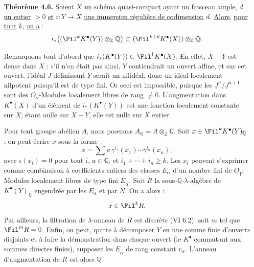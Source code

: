 
\textbf{Théorème 4.6.}
\uline{Soient} \(X\) \uline{un schéma quasi-compact ayant un faisceau ample}, \(d\) \uline{un entier} \(>0\) \uline{et} \(i:Y\to X\) \uline{une immersion régulière de codimension} \(d\). \uline{Alors}, \uline{pour tout} \(k\), \uline{on a} :
\[
 i_*\bigl((\Fil^kK^{\bullet}(Y))\otimes_{\mathbb Z}\mathbb Q\bigr)
 \subset
 (\Fil^{k+d}K^{\bullet}(X))\otimes_{\mathbb Z}\mathbb Q.
\]

Remarquons tout d'abord que \(i_*(K^{\bullet}(Y))\subset \Fil^1K^{\bullet}(X)\). En effet, \(X-Y\) est dense dans \(X\) : s'il n'en était pas ainsi, \(Y\) contiendrait un ouvert affine, et sur cet ouvert, l'idéal \(\underline{J}\) définissant \(Y\) serait un nilidéal, donc un idéal localement nilpotent puisqu'il est de type fini. Or ceci est impossible, puisque les \(\underline{J}^n/\underline{J}^{n+1}\) sont des \(\underline{O}_Y\)-Modules localement libres de rang \(\ne0\). L'augmentation dans \(K^{\bullet}(X)\) d'un élément de \(i_*(K^{\bullet}(Y))\) est une fonction localement constante sur \(X\); étant nulle sur \(X-Y\), elle est nulle sur \(X\) entier.

Pour tout groupe abélien \(A\), nous poserons \(A_{\mathbb Q}=A\otimes_{\mathbb Z}\mathbb Q\). Soit \(x\in\Fil^kK^{\bullet}(Y)_{\mathbb Q}\) ; on peut écrire \(x\) sous la forme :
\[
  x=\sum a\,\gamma^{i_1}(x_1)\cdots\gamma^{i_n}(x_n),
\]
avec \(\epsilon(x_i)=0\) pour tout \(i\), \(a\in\mathbb Q\), et \(i_1+\cdots+i_n\ge k\). Les \(x_i\) peuvent s'exprimer comme combinaison à coefficients entiers des classes \(E_\alpha\) d'un nombre fini de \(\underline{O}_Y\)-Modules localement libres de type fini \(\underline{E}_\alpha\). Soit \(R\) la sous-\(\mathbb Q\)-\(\lambda\)-algèbre de \(K^{\bullet}(Y)_{\mathbb Q}\) engendrée par les \(E_\alpha\) et par \(N\). On a alors :
\[
  x\in\Fil^kR.
\]
Par ailleurs, la filtration de \(\lambda\)-anneau de \(R\) est discrète (VI 6.2); soit \(m\) tel que \(\Fil^mR=0\). Enfin, on peut, quitte à décomposer \(Y\) en une somme finie d'ouverts disjoints et à faire la démonstration dans chaque ouvert (le \(K^{\bullet}\) commutant aux sommes directes finies), supposer les \(\underline{E}_\alpha\) de rang constant \(r_\alpha\). L'anneau d'augmentation de \(R\) est alors \(\mathbb Q\).

